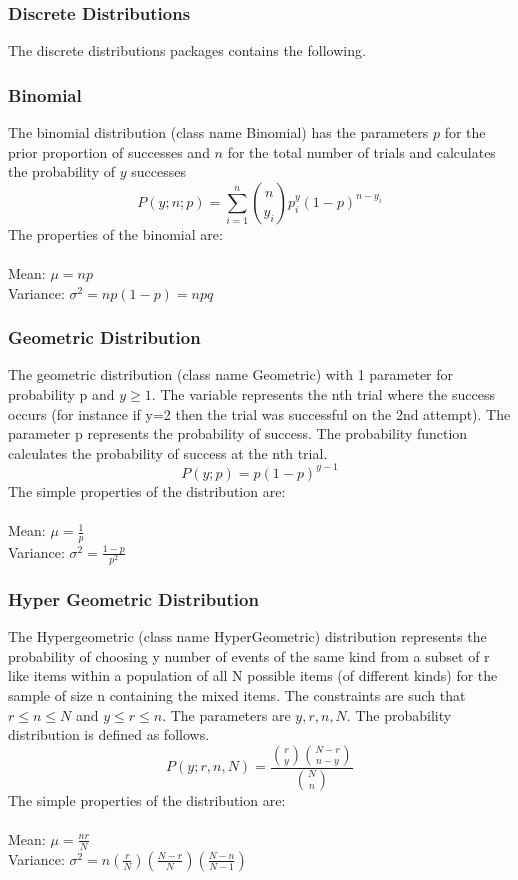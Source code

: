 
\subsubsection{Discrete Distributions}

The discrete distributions packages contains the following. 

\subsubsection*{Binomial}

The binomial distribution (class name Binomial) has the parameters $p$ for the prior proportion of successes and $n$ for the total number of trials and calculates the probability of $y$ successes 
$$
P(y; n; p) = \sum_{i=1}^n {n \choose y_i} p^y_i (1-p)^{n-y_i} 
$$
The properties of the binomial are:\\\\
Mean: $\mu = np$\\
Variance: $\sigma^2 = np \left( 1-p \right) = npq$


\subsubsection*{Geometric Distribution}
The geometric distribution (class name Geometric) with 1 parameter for probability p and $y \ge 1$.
The variable represents the nth trial where the success occurs (for instance if y=2 then the trial was successful on the 2nd attempt). The parameter p represents the probability of success. The probability  function calculates the probability of success at the nth trial.
$$
P(y;p) = p(1-p)^{y-1}
$$
The simple properties of the distribution are:\\\\
Mean: $\mu = \frac{1}{p}$\\
Variance: $\sigma^2 = \frac{1-p}{p^2}$

\subsubsection*{Hyper Geometric Distribution}
The Hypergeometric (class name HyperGeometric) distribution represents the probability of choosing y number of events of the same kind from a subset of r like items within a population of all N possible items (of different kinds) for the sample of size n containing the mixed items. The constraints are such that $r \le n \le N$ and $y \le r \le n$. The parameters are $y,r,n,N$.
The probability distribution is defined as follows.
$$
P(y; r,n,N) = \frac{ {r \choose y } {{N - r} \choose {n - y} } } {  {N \choose n} }
$$
The simple properties of the distribution are:\\\\
Mean: $\mu = \frac{nr}{N}$\\
Variance: $\sigma^2 = n \left( \frac{r}{N} \right) \left( \frac{N - r}{N} \right) \left( \frac{N - n}{N-1}\right)$

